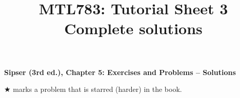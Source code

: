 \documentclass[11pt,a4paper]{article}
\title{\textbf{MTL783: Tutorial Sheet 3}\\[0.3em]\large Complete solutions}
\date{}
\begin{document}
{\centering\Large\bfseries Sipser (3rd ed.), Chapter 5: Exercises and Problems -- Solutions\par}
{\centering\small $\bigstar$ marks a problem that is starred (harder) in the book.\par}




\end{document}
